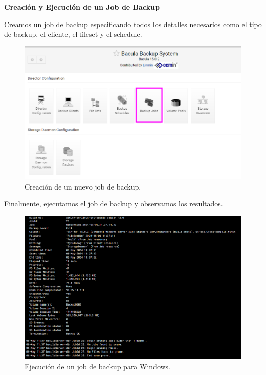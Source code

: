 \textbf{Creación y Ejecución de un Job de Backup}

Creamos un job de backup especificando todos los detalles necesarios como el tipo de backup, el cliente, el fileset y el schedule.

\begin{figure}[H]
    \centering
    \includegraphics[width=0.5\linewidth]{instalacionBacula/createJOB.png}
    \caption{Creación de un nuevo job de backup.}
\end{figure}

Finalmente, ejecutamos el job de backup y observamos los resultados.

\begin{figure}[H]
    \centering
    \includegraphics[width=0.5\linewidth]{instalacionBacula/backupWindows.png}
    \caption{Ejecución de un job de backup para Windows.}
\end{figure}